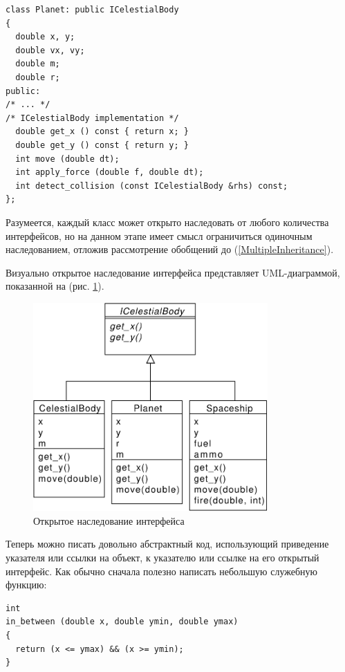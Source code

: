\documentclass[a4paper,12pt,oneside]{book}
\begin{document}
\begin{lstlisting}
class Planet: public ICelestialBody
{
  double x, y;
  double vx, vy;
  double m;
  double r;
public:
/* ... */
/* ICelestialBody implementation */
  double get_x () const { return x; }
  double get_y () const { return y; }
  int move (double dt);
  int apply_force (double f, double dt);
  int detect_collision (const ICelestialBody &rhs) const;
};
\end{lstlisting}

Разумеется, каждый класс может открыто наследовать от любого количества интерфейсов, но на данном этапе имеет смысл ограничиться одиночным наследованием, отложив рассмотрение обобщений до (\ref{MultipleInheritance}).

Визуально открытое наследование интерфейса представляет UML-диаграммой, показанной на (рис. \ref{fig:inheritance-interface}).

\begin{figure}[ht]
\centering
\includegraphics[width=0.8\textwidth]{illustrations/intf-inheritance-crop.pdf}
\caption{Открытое наследование интерфейса}
\label{fig:inheritance-interface}
\end{figure}

Теперь можно писать довольно абстрактный код, использующий приведение указателя или ссылки на объект, к указателю или ссылке на его открытый интерфейс. Как обычно сначала полезно написать небольшую служебную функцию:

\begin{lstlisting}
int 
in_between (double x, double ymin, double ymax)
{
  return (x <= ymax) && (x >= ymin);
}
\end{lstlisting}
\end{document}
